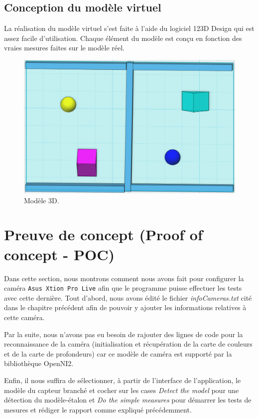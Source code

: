 \documentclass[a4paper, 12pt]{book}
\newcounter{program}[subsection]
\begin{document}
\subsection{Conception du modèle virtuel}
La réalisation du modèle virtuel s'est faite à l'aide du logiciel 123D Design qui est assez facile d'utilisation. Chaque élément du modèle est conçu en fonction des vraies mesures faites sur le modèle réel.
\begin{center}
	\begin{figure}[htbp]
  		\hspace{0.37cm}
 		\includegraphics[scale=0.35]{images/3DModel.png} \hspace{2cm}
  		\caption{Modèle 3D.\label{fig-3Dmodel}}
	\end{figure}
\end{center}

\section{Preuve de concept (Proof of concept - POC)}
Dans cette section, nous montrons comment nous avons fait pour configurer la caméra \texttt{Asus Xtion Pro Live} afin que le programme puisse effectuer les tests avec cette dernière.
Tout d'abord, nous avons édité le fichier \emph{infoCameras.txt} cité dans le chapitre précédent afin de pouvoir y ajouter les informations relatives à cette caméra.
\par Par la suite, nous n'avons pas eu besoin de rajouter des lignes de code pour la reconnaissance de la caméra (initialisation et récupération de la carte de couleurs et de la carte de profondeurs) car ce modèle de caméra est supporté par la bibliothèque OpenNI2.
\par Enfin, il nous suffira de sélectionner, à partir de l'interface de l'application, le modèle du capteur branché et cocher sur les cases \emph{Detect the model} pour une détection du modèle-étalon et \emph{Do the simple measures} pour démarrer les tests de mesures et rédiger le rapport comme expliqué précédemment. 
\end{document}
